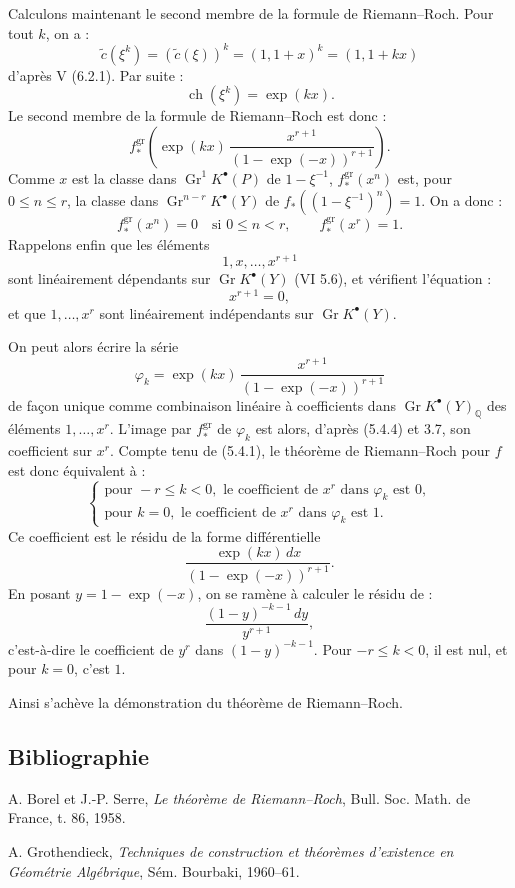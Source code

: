 \documentclass[11pt]{article}
\newcommand{\Gr}{\operatorname{Gr}}
\newcommand{\ch}{\operatorname{ch}}
\providecommand{\ch}{\operatorname{ch}}
\providecommand{\Gr}{\operatorname{Gr}}
\providecommand{\Gr}{\operatorname{G}}
\begin{document}
Calculons maintenant le second membre de la formule de Riemann--Roch. Pour tout \(k\), on a :
\[
 \widetilde c(\xi^k)=(\widetilde c(\xi))^k=(1,1+x)^k=(1,1+kx)
\]
d'après V (6.2.1). Par suite :
\begin{equation}\tag{5.4.2}
 \ch(\xi^k)=\exp(kx).
\end{equation}
Le second membre de la formule de Riemann--Roch est donc :
\begin{equation}\tag{5.4.3}
 f^{\mathrm{gr}}_*\left(\exp(kx)\,
 \frac{x^{r+1}}{(1-\exp(-x))^{r+1}}\right).
\end{equation}
Comme \(x\) est la classe dans \(\Gr^1K^{\bullet}(P)\) de \(1-\xi^{-1}\), \(f^{\mathrm{gr}}_*(x^n)\) est, pour \(0\leq n\leq r\), la classe dans
\(\Gr^{n-r}K^{\bullet}(Y)\) de \(f_*((1-\xi^{-1})^n)=1\). On a donc :
\begin{equation}\tag{5.4.4}
 f^{\mathrm{gr}}_*(x^n)=0\quad\text{si }0\leq n<r,\qquad
 f^{\mathrm{gr}}_*(x^r)=1.
\end{equation}
Rappelons enfin que les éléments
\[
1,x,\ldots,x^{r+1}
\]
sont linéairement dépendants sur \(\Gr K^{\bullet}(Y)\) (VI 5.6), et vérifient l'équation :
\begin{equation}\tag{5.4.5}
 x^{r+1}=0,
\end{equation}
et que \(1,\ldots,x^r\) sont linéairement indépendants sur \(\Gr K^{\bullet}(Y)\).

On peut alors écrire la série
\[
\varphi_k=\exp(kx)\,
\frac{x^{r+1}}{(1-\exp(-x))^{r+1}}
\]
de façon unique comme combinaison linéaire à coefficients dans
\(\Gr K^{\bullet}(Y)_{\mathbb Q}\) des éléments \(1,\ldots,x^r\). L'image par \(f^{\mathrm{gr}}_*\) de \(\varphi_k\) est alors, d'après (5.4.4) et 3.7, son coefficient sur \(x^r\). Compte tenu de (5.4.1), le théorème de Riemann--Roch pour \(f\) est donc équivalent à :
\[
\left\{
\begin{array}{ll}
\text{pour }-r\leq k<0,\text{ le coefficient de }x^r\text{ dans }\varphi_k\text{ est }0,\\
\text{pour }k=0,\text{ le coefficient de }x^r\text{ dans }\varphi_k\text{ est }1.
\end{array}
\right.
\tag{RR}
\]
Ce coefficient est le résidu de la forme différentielle
\[
 \frac{\exp(kx)\,dx}{(1-\exp(-x))^{r+1}}.
\]
En posant \(y=1-\exp(-x)\), on se ramène à calculer le résidu de :
\[
 \frac{(1-y)^{-k-1}\,dy}{y^{r+1}},
\]
c'est-à-dire le coefficient de \(y^r\) dans \((1-y)^{-k-1}\). Pour \(-r\leq k<0\), il est nul, et pour \(k=0\), c'est \(1\).

Ainsi s'achève la démonstration du théorème de Riemann--Roch.

\subsection*{Bibliographie}
\begin{enumerate}[label={[\arabic*]}]
\item A. Borel et J.-P. Serre, \emph{Le théorème de Riemann--Roch}, Bull. Soc. Math. de France, t. 86, 1958.
\item A. Grothendieck, \emph{Techniques de construction et théorèmes d'existence en Géométrie Algébrique}, Sém. Bourbaki, 1960--61.
\end{enumerate}
\end{document}
